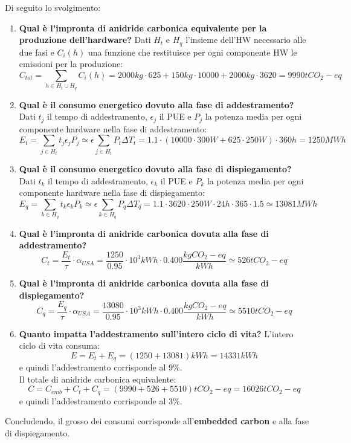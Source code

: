 Di seguito lo svolgimento:
\begin{enumerate}
	\item \textbf{Qual è l’impronta di anidride carbonica equivalente per la produzione dell’hardware?}
	Dati $H_t$ e $H_q$ l'insieme dell'HW necessario alle due fasi e $C_i(h)$ una funzione che restituisce per ogni componente HW le emissioni per la produzione:
	\begin{equation*}
		C_{tot}=\sum_{h \in H_t \cup H_q} C_i(h) = 2000 kg \cdot 625 + 150 kg \cdot 10000 + 2000 kg \cdot 3620 = 9990 tCO_2-eq
	\end{equation*}
	\item \textbf{Qual è il consumo energetico dovuto alla fase di addestramento?}
	Dati $t_j$ il tempo di addestramento, $\epsilon_j$ il PUE e $P_j$ la potenza media per ogni componente hardware nella fase di addestramento:
	\begin{equation*}
		E_t  = \sum_{j \in H_t} t_j \epsilon_j P_j \simeq \epsilon \sum_{j \in H_t} P_t \Delta T_t = 1.1 \cdot (10000 \cdot 300W + 625 \cdot 250W) \cdot 360h = 1250 MWh
	\end{equation*}
	\item \textbf{Qual è il consumo energetico dovuto alla fase di dispiegamento?}
	Dati $t_k$ il tempo di addestramento, $\epsilon_k$ il PUE e $P_k$ la potenza media per ogni componente hardware nella fase di dispiegamento:
	\begin{equation*}
		E_q  = \sum_{k \in H_q} t_k \epsilon_k P_k \simeq \epsilon \sum_{k \in H_q} P_q \Delta T_q = 1.1 \cdot 3620 \cdot 250W \cdot 24h \cdot 365 \cdot 1.5 \simeq 13081MWh
	\end{equation*}
	\item \textbf{Qual è l’impronta di anidride carbonica dovuta alla fase di addestramento?}
	\begin{equation*}
		C_t = \frac{E_t}{\tau}\cdot \alpha_{USA} = \frac{1250}{0.95}\cdot 10^3 kWh \cdot 0.400 \frac{kgCO_2-eq}{kWh}\simeq 526 tCO_2-eq
	\end{equation*}
	\item \textbf{Qual è l’impronta di anidride carbonica dovuta alla fase di dispiegamento?}
	\begin{equation*}
		C_q = \frac{E_q}{\tau}\cdot \alpha_{USA} = \frac{13080}{0.95}\cdot 10^3 kWh \cdot 0.400 \frac{kgCO_2-eq}{kWh}\simeq 5510 tCO_2-eq
	\end{equation*}
	\item \textbf{Quanto impatta l’addestramento sull’intero ciclo di vita?}
	L'intero ciclo di vita consuma:
	\begin{equation*}
		E = E_t + E_q = (1250 + 13081)kWh = 14331 kWh
	\end{equation*}
	e quindi l'addestramento corrisponde al $9\%$.\\
	Il totale di anidride carbonica equivalente:
	\begin{equation*}
		C = C_{emb}+C_t + C_q = (9990 + 526 + 5510)tCO_2-eq = 16026 tCO_2-eq
	\end{equation*}
	e quindi l'addestramento corrisponde al $3\%$.
\end{enumerate}
Concludendo, il grosso dei consumi corrisponde all'\textbf{embedded carbon} e alla fase di dispiegamento.
